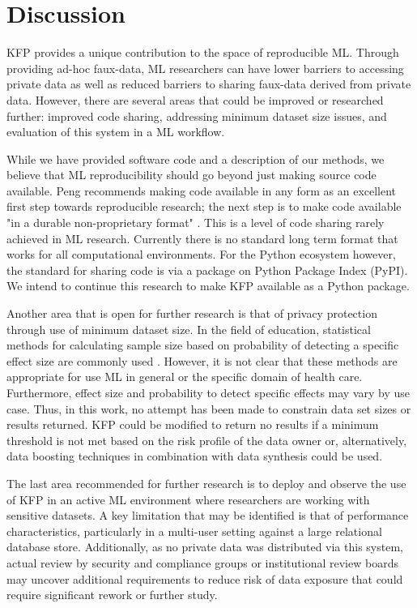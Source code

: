 \documentclass{article}
\begin{document}
\section{Discussion}

KFP provides a unique contribution to the space of reproducible ML. Through providing ad-hoc faux-data, ML researchers can have lower barriers to accessing private data as well as reduced barriers to sharing faux-data derived from private data. However, there are several areas that could be improved or researched further: improved code sharing, addressing minimum dataset size issues, and evaluation of this system in a ML workflow.

While we have provided software code and a description of our methods, we believe that ML reproducibility should go beyond just making source code available. Peng recommends making code available in any form as an excellent first step towards reproducible research; the next step is to make code available "in a durable non-proprietary format" \cite{peng_reproducible_2011}. This is a level of code sharing rarely achieved in ML research. Currently there is no standard long term format that works for all computational environments. For the Python ecosystem however, the standard for sharing code is via a package on Python Package Index (PyPI). We intend to continue this research to make KFP available as a Python package.

Another area that is open for further research is that of privacy protection through use of minimum dataset size. In the field of education, statistical methods for calculating sample size based on probability of detecting a specific effect size are commonly used \cite{naep_2009}. However, it is not clear that these methods are appropriate for use ML in general or the specific domain of health care. Furthermore, effect size and probability to detect specific effects may vary by use case. Thus, in this work, no attempt has been made to constrain data set sizes or results returned. KFP could be modified to return no results if a minimum threshold is not met based on the risk profile of the data owner or, alternatively, data boosting techniques in combination with data synthesis could be used.

The last area recommended for further research is to deploy and observe the use of KFP in an active ML environment where researchers are working with sensitive datasets. A key limitation that may be identified is that of performance characteristics, particularly in a multi-user setting against a large relational database store. Additionally, as no private data was distributed via this system, actual review by security and compliance groups or institutional review boards may uncover additional requirements to reduce risk of data exposure that could require significant rework or further study.
\end{document}
